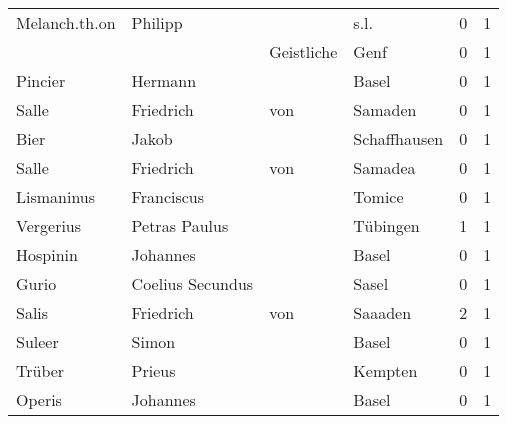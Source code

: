 \documentclass[10pt,a4paper,landscape]{article}
\begin{document}
\begin{longtable}{llllrr}
            Melanch.th.on &                            Philipp &             &                                        s.l. &          0 &         1 \\
                          &                                    &  Geistliche &                                        Genf &          0 &         1 \\
                  Pincier &                            Hermann &             &                                       Basel &          0 &         1 \\
                    Salle &                          Friedrich &         von &                                     Samaden &          0 &         1 \\
                     Bier &                              Jakob &             &                                Schaffhausen &          0 &         1 \\
                    Salle &                          Friedrich &         von &                                     Samadea &          0 &         1 \\
               Lismaninus &                         Franciscus &             &                                      Tomice &          0 &         1 \\
                Vergerius &                      Petras Paulus &             &                                    Tübingen &          1 &         1 \\
                 Hospinin &                           Johannes &             &                                       Basel &          0 &         1 \\
                    Gurio &                   Coelius Secundus &             &                                       Sasel &          0 &         1 \\
                    Salis &                          Friedrich &         von &                                     Saaaden &          2 &         1 \\
                   Suleer &                              Simon &             &                                       Basel &          0 &         1 \\
                   Trüber &                             Prieus &             &                                     Kempten &          0 &         1 \\
                   Operis &                           Johannes &             &                                       Basel &          0 &         1 \\

\end{longtable}
\end{document}
